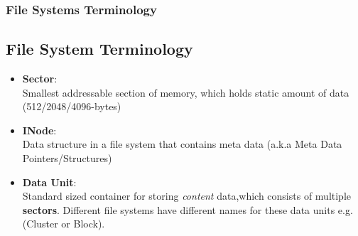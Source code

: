 \documentclass{beamer}
\begin{document}
\begin{frame}[allowframebreaks]
	
		
\end{frame}

\begin{frame}
	\frametitle{File Systems Terminology}
	\subsection*{File System Terminology}
	\begin{itemize}
		\item{\textbf{Sector}}:\\ Smallest addressable section of memory, which holds static amount of data (512/2048/4096-bytes)
		\item\textbf{INode}:\\ Data structure in a file system that contains meta data (a.k.a Meta Data Pointers/Structures)
		\item\textbf{Data Unit}:\\ Standard sized container for storing \textit{content} data,which consists of multiple \textbf{sectors}. Different file systems have different names for these data units e.g. (Cluster or Block). 
	\end{itemize}
\end{frame}
\end{document}
